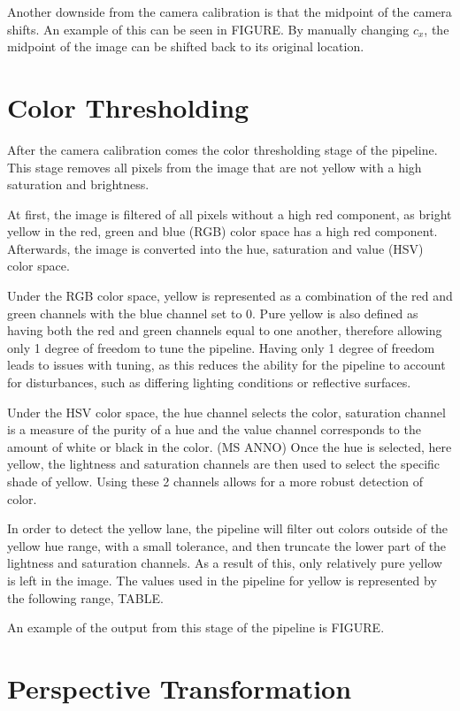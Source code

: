 \documentclass[arbeit=studie,oneside,BCOR=12mm]{ArbeitRST}
\begin{document}
Another downside from the camera calibration is that the midpoint of the camera
shifts. An example of this can be seen in FIGURE. By manually
changing $c_x$, the midpoint of the image can be shifted back to its 
original location.

\section{Color Thresholding}

After the camera calibration comes the color thresholding stage of the pipeline.
This stage removes all pixels from the image that are not yellow with a high
saturation and brightness. 

At first, the image is filtered of all pixels without a high red component, as
bright yellow in the red, green and blue (RGB) color space has a high red
component. Afterwards, the image is converted into the hue, saturation and
value (HSV) color space. 

Under the RGB color space, yellow is represented as a combination of the red 
and green channels with the blue channel set to 0. Pure yellow is also defined 
as having both the red and green channels equal to one another, therefore 
allowing only 1 degree of freedom to tune the pipeline.  Having only 1 degree 
of freedom leads to issues with tuning, as this reduces the ability for the 
pipeline to account for disturbances, such as differing lighting conditions or 
reflective surfaces.

Under the HSV color space, the hue channel selects the color, saturation
channel is a measure of the purity of a hue and the value channel corresponds
to the amount of white or black in the color. (MS ANNO) Once the hue is
selected, here yellow, the lightness and saturation channels are then used to
select the specific shade of yellow. Using these 2 channels allows for a more
robust detection of color.

In order to detect the yellow lane, the pipeline will filter out colors outside 
of the yellow hue range, with a small tolerance, and then truncate the lower 
part of the lightness and saturation channels. As a result of this, only 
relatively pure yellow is left in the image.
The values used in the pipeline for yellow is represented by the following 
range,
TABLE.

An example of the output from this stage of the pipeline is FIGURE.

\section{Perspective Transformation}
\end{document}
